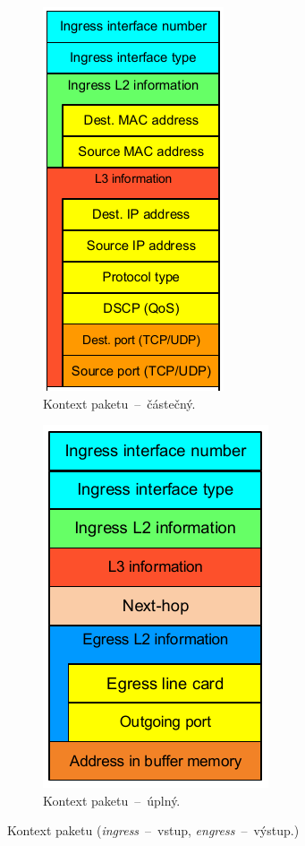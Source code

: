 \begin{figure}[H]
    \centering
    \begin{subfigure}{.5\textwidth}
        \centering
        \includegraphics[width=.5\linewidth]{kontext_castecny.pdf}
        \caption{Kontext paketu~--~částečný.}
    \end{subfigure}%
    \begin{subfigure}{.5\textwidth}
        \centering
        \includegraphics[width=.5\linewidth]{kontext_uplny.pdf}
        \caption{Kontext paketu~--~úplný.}
    \end{subfigure}
    \caption{Kontext paketu (\textit{ingress}~--~vstup, \textit{engress}~--~výstup.)}
\end{figure}

